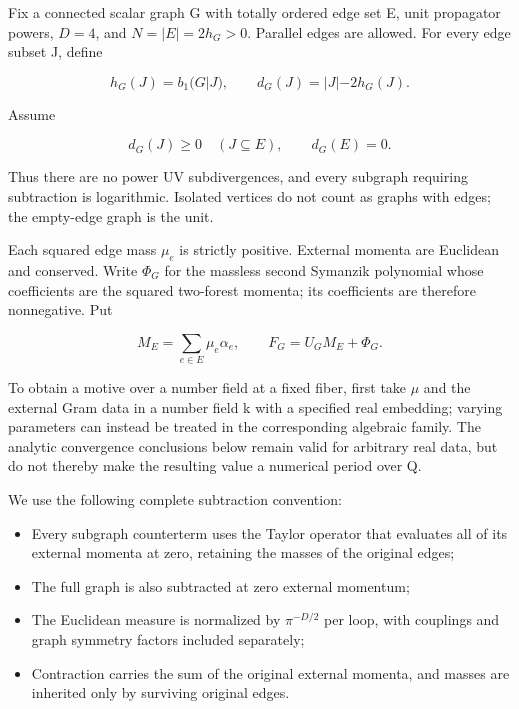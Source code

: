 \documentclass[11pt,a4paper,oneside]{article}
\theoremstyle{plain}
\theoremstyle{definition}
\theoremstyle{remark}
\newcommand{\tightlist}{\setlength{\itemsep}{0pt}\setlength{\parskip}{0pt}}
\numberwithin{equation}{section}
\begin{document}
Fix a connected scalar graph G with totally ordered edge set E, unit propagator powers, \(D=4\), and \(N=|E|=2h_G>0\). Parallel edges are allowed. For every edge subset J, define

\begin{equation}
h_G(J)=b_1(G|J),\qquad d_G(J)=|J|-2h_G(J).
\end{equation}

Assume

\begin{equation}
d_G(J)\geq0\quad(J\subseteq E),\qquad d_G(E)=0.       \label{eq:zero:1}
\end{equation}

Thus there are no power UV subdivergences, and every subgraph requiring subtraction is logarithmic. Isolated vertices do not count as graphs with edges; the empty-edge graph is the unit.

Each squared edge mass \(\mu _e\) is strictly positive. External momenta are Euclidean and conserved. Write \(\Phi _G\) for the massless second Symanzik polynomial whose coefficients are the squared two-forest momenta; its coefficients are therefore nonnegative. Put

\begin{equation}
M_E=\sum_{e\in E}\mu_e\alpha_e,\qquad F_G=U_GM_E+\Phi_G.
\end{equation}

To obtain a motive over a number field at a fixed fiber, first take \(\mu \) and the external Gram data in a number field k with a specified real embedding; varying parameters can instead be treated in the corresponding algebraic family. The analytic convergence conclusions below remain valid for arbitrary real data, but do not thereby make the resulting value a numerical period over Q.

We use the following complete subtraction convention:

\begin{itemize}
\tightlist
\item
  Every subgraph counterterm uses the Taylor operator that evaluates all of its external momenta at zero, retaining the masses of the original edges;
\item
  The full graph is also subtracted at zero external momentum;
\item
  The Euclidean measure is normalized by \(\pi ^{-D/2}\) per loop, with couplings and graph symmetry factors included separately;
\item
  Contraction carries the sum of the original external momenta, and masses are inherited only by surviving original edges.
\end{itemize}
\end{document}
